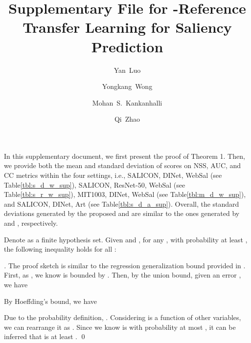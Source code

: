 \documentclass[runningheads]{llncs}
\makeatletter
\newcommand{\tab}{{Table}\@\xspace}
\newcommand{\ie}{{i.e.,}\@\xspace}
\makeatother
\begin{document}
\pagestyle{headings}
\mainmatter
\def\ECCVSubNumber{615}  

\title{Supplementary File for -Reference Transfer Learning for Saliency Prediction} 

\begin{comment}
\titlerunning{ECCV-20 submission ID \ECCVSubNumber} 
\authorrunning{ECCV-20 submission ID \ECCVSubNumber} 
\author{Anonymous ECCV submission}
\institute{Paper ID \ECCVSubNumber}
\end{comment}


\author{Yan~Luo \and
Yongkang~Wong \and
Mohan~S.~Kankanhalli \and
Qi~Zhao}


\maketitle
In this supplementary document, we first present the proof of Theorem 1. Then, we provide both the mean and standard deviation of scores on NSS, AUC, and CC metrics within the four settings, \ie SALICON, DINet, WebSal (see \tab \ref{tbl:s_d_w_sup}), SALICON, ResNet-50, WebSal (see \tab \ref{tbl:s_r_w_sup}), MIT1003, DINet, WebSal (see \tab \ref{tbl:m_d_w_sup}), and SALICON, DINet, Art (see \tab \ref{tbl:s_d_a_sup}). Overall, the standard deviations generated by the proposed  and  are similar to the ones generated by  and , respectively.

\begin{theorem}
	Denote  as a finite hypothesis set. Given  and , for any , with probability at least , the following inequality holds for all :
	
\end{theorem}
\begin{proof}[]
	The proof sketch is similar to the regression generalization bound provided in \cite{Mohri_MIT_2012}.
	First, as , we know  is bounded by . Then, by the union bound, given an error , we have
	
	By Hoeffding's bound, we have
	
	Due to the probability definition, . Considering  is a function of other variables, we can rearrange it as 
	.
Since we know  is with probability at most , it can be inferred that  is at least .
	\qed
\end{proof}
\end{document}

